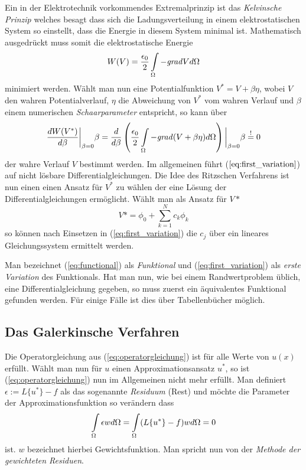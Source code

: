 Ein in der Elektrotechnik vorkommendes Extremalprinzip ist das \textit{Kelvinsche Prinzip} welches besagt dass sich die Ladungsverteilung in einem elektrostatischen System so einstellt, dass die Energie in diesem System minimal ist.\newline
Mathematisch ausgedrückt muss somit die elektrostatische Energie 
\begin{equation}
\label{eq:functional}
W(V) = \frac{\epsilon_0}{2} \int\displaylimits_{\Omega} -\mathit{grad}V d\Omega
\end{equation}
 minimiert werden. Wählt man nun eine Potentialfunktion $V^* = V + \beta \eta$, wobei $V$ den wahren Potentialverlauf, $\eta$ die Abweichung von $V^*$ vom wahren Verlauf und $\beta$ einem numerischen \textit{Schaarparameter} entspricht, so kann über 
 \begin{equation}
 \label{eq:first_variation}
 \frac{dW(V^*)}{d\beta}\bigg\vert_{\beta = 0} \beta = \frac{d}{d\beta} \left(\frac{\epsilon_0}{2} \int\displaylimits_{\Omega} - \mathit{grad}(V + \beta \eta) d\Omega \right)\bigg\vert_{\beta = 0} \beta \overset{!}{=} 0
 \end{equation} 
 der wahre Verlauf $V$ bestimmt werden.\newline
 Im allgemeinen führt ($\ref{eq:first_variation}$) auf nicht lösbare Differentialgleichungen. Die Idee des Ritzschen Verfahrens ist nun einen einen Ansatz für $V^*$ zu wählen der eine Lösung der Differentialgleichungen ermöglicht.\newline
 Wählt man als Ansatz für $V*$
 \begin{equation}
 V* = \phi_0 + \sum_{k = 1}^{N} c_k \phi_k
 \end{equation}
 so können nach Einsetzen in (\ref{eq:first_variation}) die $c_j$ über ein lineares Gleichungssystem ermittelt werden.\newline
 
 Man bezeichnet (\ref{eq:functional}) als \textit{Funktional} und (\ref{eq:first_variation}) als \textit{erste Variation} des Funktionals.\newline
 Hat man nun, wie bei einem Randwertproblem üblich, eine Differentialgleichung gegeben, so muss zuerst ein äquivalentes Funktional gefunden werden. Für einige Fälle ist dies über Tabellenbücher möglich.


\subsection{Das Galerkinsche Verfahren}
Die Operatorgleichung aus (\ref{eq:operatorgleichung}) ist für alle Werte von $u(x)$ erfüllt. Wählt man nun für $u$ einen Approximationsansatz $u^*$, so ist (\ref{eq:operatorgleichung}) nun im Allgemeinen nicht mehr erfüllt. Man definiert $\epsilon := L\{ u^* \} -f$ als das sogenannte \textit{Residuum} (Rest) und möchte die Parameter der Approximationsfunktion so verändern dass 
\begin{equation}
\label{eq:weighted_residuum}
\int\displaylimits_{\Omega}\epsilon w d\Omega = \int\displaylimits_{\Omega} (L\{ u^* \} -f)w d\Omega= 0
\end{equation}
ist. $w$ bezeichnet hierbei Gewichtsfunktion. Man spricht nun von der \textit{Methode der gewichteten Residuen}.\newline



